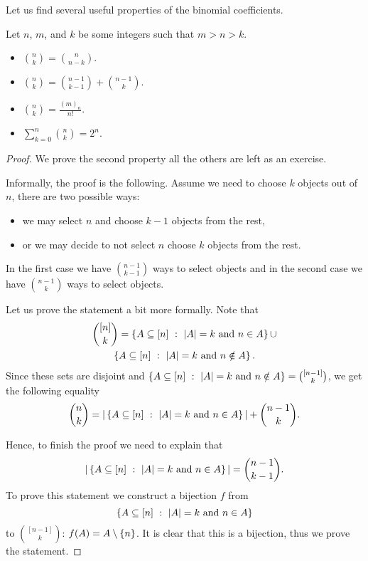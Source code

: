Let us find several useful properties of the binomial coefficients.
\begin{theorem}
  Let $n$, $m$, and $k$ be some integers such that $m > n > k$.
  \begin{itemize}
    \item $\binom{n}{k} = \binom{n}{n - k}$.
    \item $\binom{n}{k} = \binom{n - 1}{k - 1} + \binom{n - 1}{k}$.
    \item $\binom{n}{k} = \frac{(m)_n}{n!}$.
    \item $\sum\limits_{k = 0}^n \binom{n}{k} = 2^n$.
  \end{itemize}
\end{theorem}
\begin{proof}
  We prove the second property all the others are left as an exercise.

  Informally, the proof is the following. Assume we need to choose $k$ objects
  out of $n$, there are two possible ways:
  \begin{itemize}
    \item we may select $n$ and choose $k - 1$ objects from the rest,
    \item or we may decide to not select $n$ choose $k$ objects from the rest.
  \end{itemize}
  In the first case we have $\binom{n - 1}{k - 1}$ ways to select objects and
  in the second case we have $\binom{n - 1}{k}$ ways to select objects.

  Let us prove the statement a bit more formally. Note that
  \begin{multline*}
    \binom{[n]}{k} = \set[|A| = k \text{ and } n \in A]{A \subseteq [n]} \cup \\
    \set[|A| = k \text{ and } n \notin A]{A \subseteq [n]}.
  \end{multline*}
  Since these sets are disjoint and $\set[|A| = k \text{ and } n \notin A]{A
  \subseteq [n]} = \binom{[n - 1]}{k}$, we get the following equality
  \[
    \binom{n}{k} = |\set[|A| = k \text{ and } n \in A]{A \subseteq [n]}| +
    \binom{n - 1}{k}.
  \]

  Hence, to finish the proof we need to explain that
  \[
    |\set[|A| = k \text{ and } n \in A]{A \subseteq [n]}| =
    \binom{n - 1}{k - 1}.
  \]
  To prove this statement we construct a bijection $f$
  from \[
    \set[|A| = k \text{ and } n \in A]{A \subseteq [n]}
  \] to
  $\binom{[n - 1]}{k}$: $f(A) = A \setminus \set{n}$.
  It is clear that this is a bijection, thus we prove the statement.
\end{proof}

